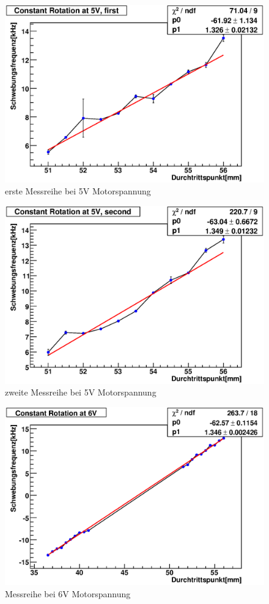 \documentclass[12pt]{article}
\begin{document}
\begin{figure}[H]  
\centering
\includegraphics[width=0.7\linewidth]{pictures/5V_11.eps}
\caption{erste Messreihe bei 5V Motorspannung}
\label{versuchsaufbau}
\end{figure}

\begin{figure}[H]  
\centering
\includegraphics[width=0.7\linewidth]{pictures/5V_21.eps}
\caption{zweite Messreihe bei 5V Motorspannung}
\label{versuchsaufbau}
\end{figure}

\begin{figure}[H]  
\centering
\includegraphics[width=0.7\linewidth]{pictures/6V2.eps}
\caption{Messreihe bei 6V Motorspannung}
\label{versuchsaufbau}
\end{figure}
\end{document}

